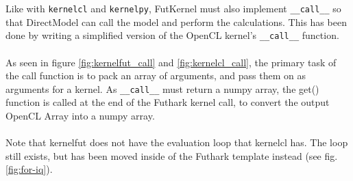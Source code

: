 \documentclass[11pt]{article}
\newcommand{\call}{\texttt{\_\_call\_\_}}
\begin{document}
Like with \texttt{kernelcl} and \texttt{kernelpy}, FutKernel must also implement
\call{} so that DirectModel can call the model and perform the
calculations.
This has been done by writing a simplified version of the OpenCL kernel's 
\call{} function. 
\\\\
As seen in figure \ref{fig:kernelfut_call} and \ref{fig:kernelcl_call},
the primary task of the call function is to pack an array of arguments, and
pass them on as arguments for a kernel.
As \call{} must return a numpy array, the get() function is called at the end
of the Futhark kernel call, to convert the output OpenCL Array into a 
numpy array.
\\\\
Note that kernelfut does not have the evaluation loop that kernelcl has.
The loop still exists, but has been moved inside of the Futhark template 
instead (see fig. \ref{fig:for-iq}).
\end{document}
